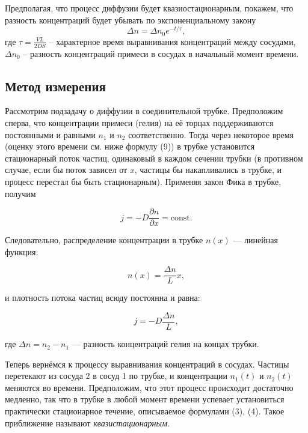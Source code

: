 \documentclass[a4paper,12pt]{article}
\begin{document}
        Предполагая, что процесс диффузии будет квазиостационарным, покажем, что разность концентраций будет убывать по экспоненциальному закону
        \begin{equation}
            \label{Delta_n}
            \Delta n = \Delta n_0 e^{-t / \tau},
        \end{equation}
        где $\tau = \frac{VL}{2DS}$ -- характерное время выравнивания концентраций между сосудами, $\Delta n_0$ -- разность концентраций примеси в сосудах в начальный момент
    времени.\\

    \subsection{Метод измерения}

        Рассмотрим подзадачу о диффузии в соединительной трубке. Предположим сперва, что концентрации примеси (гелия) на её торцах поддерживаются постоянными и равными $n_1$ и $n_2$ соответственно. Тогда через некоторое время (оценку этого времени см. ниже формулу (9)) в трубке установится стационарный поток частиц, одинаковый в каждом сечении трубки (в противном случае, если бы поток зависел от $x$, частицы бы накапливались в трубке, и процесс перестал бы быть стационарным). Применяя закон Фика в трубке, получим

        \begin{equation}
            j = -D \frac{\partial n}{\partial x} = \text{const}.
        \end{equation}
        
        Следовательно, распределение концентрации в трубке $n(x)$ — линейная функция:
        
        \begin{equation}
            n(x) = \frac{\Delta n}{L} x,
        \end{equation}
        
        и плотность потока частиц всюду постоянна и равна:
        
        \begin{equation}
            j = -D \frac{\Delta n}{L},
        \end{equation}
        
        где $\Delta n = n_2 - n_1$ — разность концентраций гелия на концах трубки.
        
        Теперь вернёмся к процессу выравнивания концентраций в сосудах. Частицы перетекают из сосуда 2 в сосуд 1 по трубке, и концентрации $n_1(t)$ и $n_2(t)$ меняются во времени. Предположим, что этот процесс происходит достаточно медленно, так что в трубке в любой момент времени успевает установиться практически стационарное течение, описываемое формулами (3), (4). Такое приближение называют \textit{квазистационарным}.
        
\end{document}
